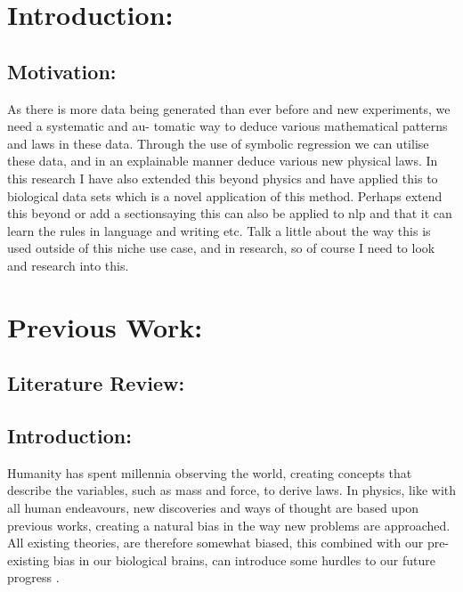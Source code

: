 \documentclass{article}
\begin{document}
\newpage

\tableofcontents 

\newpage
{}



\section{Introduction: }

\subsection{Motivation: }

As there is more data being generated than ever before and new experiments, we need a systematic and au-
tomatic way to deduce various mathematical patterns and laws in these data. Through the use of symbolic
regression we can utilise these data, and in an explainable manner deduce various new physical laws. In this
research I have also extended this beyond physics and have applied this to biological data sets which is a novel
application of this method. Perhaps extend this beyond or add a sectionsaying this can also be applied to nlp
and that it can learn the rules in language and writing etc.
Talk a little about the way this is used outside of this niche use case, and in research, so of course I need to look
and research into this.\\

\section{Previous Work: }

\subsection{Literature Review: }

\subsection{Introduction: }
  
Humanity has spent millennia observing the world, creating concepts that describe the variables, such as mass and force, to derive laws. In physics, like with
all human endeavours, new discoveries and ways of thought are based upon previous works, creating
a natural bias in the way new problems are approached. All existing theories, are therefore
somewhat biased, this combined with our pre-existing bias in our biological brains, can introduce some
hurdles to our future progress \cite{Wood2022} \cite{Schmidt2009}.\\
\end{document}

